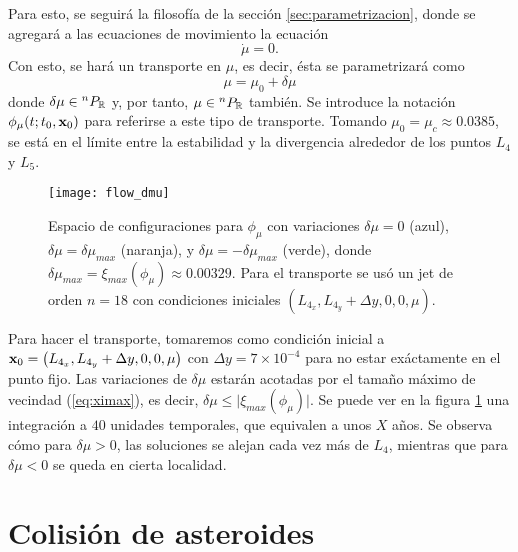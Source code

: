 Para esto, se seguirá la filosofía de la sección \ref{sec:parametrizacion}, donde se agregará a las ecuaciones de movimiento la ecuación 
\begin{equation*}
 \dot{\mu} = 0.
\end{equation*}
Con esto, se hará un transporte en $\mu$, es decir, ésta se parametrizará como 
\begin{equation*}
 \mu = \mu_0 + \delta\mu
\end{equation*}   
donde $\delta\mu \in {^{n}P_{\mathbb{R}}}$ y, por tanto, $\mu \in {^{n}P_{\mathbb{R}}}$ también. Se introduce la notación $\phi_\mu(t;t_0,\mathbf{x}_0)$ para referirse a este tipo de transporte. Tomando $\mu_0 = \mu_c \approx 0.0385$, se está en el límite entre la estabilidad y la divergencia alrededor de los puntos $L_4$ y $L_5$.

\begin{figure}
 \centering
 \texttt{[image: flow\_dmu]}
 \caption{Espacio de configuraciones para $\phi_\mu$ con variaciones $\delta\mu = 0$ (azul), $\delta\mu = \delta\mu_{max}$ (naranja), y $\delta\mu = -\delta\mu_{max}$ (verde), donde $\delta\mu_{max} = \xi_{max}(\phi_\mu) \approx 0.00329$. Para el transporte se usó un jet de orden $n=18$ con condiciones iniciales $\left( L_{4_x}, L_{4_y} + \Delta y, 0, 0, \mu \right)$.}
 \label{fig:flow_dmu}
\end{figure}

Para hacer el transporte, tomaremos como condición inicial a $\mathbf{x}_0 = \left( L_{4_x}, L_{4_y} + \Delta y, 0, 0, \mu \right)$ con $\Delta y = 7\times 10^{-4}$ para no estar exáctamente en el punto fijo. Las variaciones de $\delta\mu$ estarán acotadas por el tamaño máximo de vecindad (\ref{eq:ximax}), es decir, $\delta\mu \leq \lvert \xi_{max}(\phi_\mu) \rvert$. Se puede ver en la figura \ref{fig:flow_dmu} una integración a $40$ unidades temporales, que equivalen a unos $X$ años. Se observa cómo para $\delta \mu > 0$, las soluciones se alejan cada vez más de $L_4$, mientras que para $\delta \mu < 0$ se queda en cierta localidad.

\section{Colisión de asteroides}




